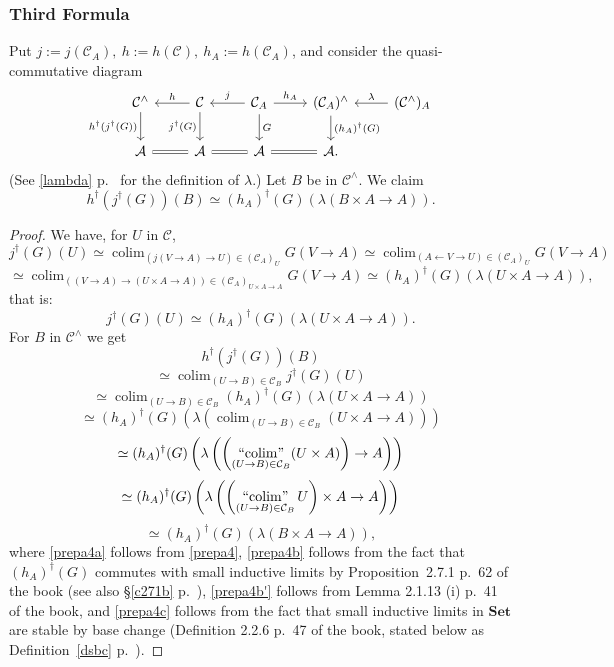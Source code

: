 \documentclass[12pt]{article}
\theoremstyle{remark}
\theoremstyle{definition}
\newcommand{\A}{\mathcal A}
\newcommand{\C}{\mathcal C}
\newcommand{\Set}{\mathbf{Set}}
\DeclareMathOperator*{\colim}{colim}
\DeclareMathOperator*{\icolim}{``\!\colim\!"}
\begin{document}
% 

\subsubsection{Third Formula}

Put $j:=j(\C_A),\ h:=h(\C),\ h_A:=h(\C_A)$, and consider the quasi-commutative diagram 
$$
\begin{tikzcd}
\C^\wedge\ar{d}[swap]{h^\dagger(j^\dagger(G))}&
\C\ar{l}[swap]{h}\ar{d}[swap]{j^\dagger(G)}&
\C_A\ar{l}[swap]{j}\ar{r}{h_A}\ar{d}{G}&
(\C_A)^\wedge\ar{d}{(h_A)^\dagger(G)}&
(\C^\wedge)_A\ar{l}[swap]{\lambda}\\ 
\A\ar[equal]{r}&\A\ar[equal]{r}&\A\ar[equal]{r}&\A.
\end{tikzcd}
$$ 
(See \eqref{lambda} p.~\pageref{lambda} for the definition of $\lambda$.) Let $B$ be in $\C^\wedge$. We claim 
\begin{equation}\label{prepa3}
h^\dagger(j^\dagger(G))(B)\simeq(h_A)^\dagger(G)(\lambda(B\times A\to A)).
\end{equation} 

\begin{proof}
We have, for $U$ in $\C$, 
$$
j^\dagger(G)(U)\simeq\colim_{(j(V\to A)\to U)\in(\C_A)_U}G(V\to A)\simeq\colim_{(A\leftarrow V\to U)\in(\C_A)_U}G(V\to A)
$$
$$
\simeq\colim_{((V\to A)\to(U\times A\to A))\in(\C_A)_{U\times A\to A}}G(V\to A)\simeq(h_A)^\dagger(G)(\lambda(U\times A\to A)),
$$
that is: 
%
\begin{equation}\label{prepa4}
j^\dagger(G)(U)\simeq(h_A)^\dagger(G)(\lambda(U\times A\to A)).
\end{equation} 
%
For $B$ in $\C^\wedge$ we get 
$$
h^\dagger(j^\dagger(G))(B)
$$
$$
\simeq\colim_{(U\to B)\in\C_B}j^\dagger(G)(U)
$$ 
%
\begin{equation}\label{prepa4a}
\simeq\colim_{(U\to B)\in\C_B}(h_A)^\dagger(G)(\lambda(U\times A\to A))
\end{equation} 
\begin{equation}\label{prepa4b}
\simeq(h_A)^\dagger(G)\left(\lambda\left(\colim_{(U\to B)\in\C_B}(U\times A\to A)\right)\right)
\end{equation} 
%
\begin{equation}\label{prepa4b'}
\simeq(h_A)^\dagger(G)\left(\lambda\left(\left(\icolim_{(U\to B)\in\C_B}(U\times A)\right)\to A\right)\right)
\end{equation}
\begin{equation}\label{prepa4c}
\simeq(h_A)^\dagger(G)\left(\lambda\left(\left(\icolim_{(U\to B)\in\C_B}U\right)\times A\to A\right)\right)
\end{equation} 
%
$$
\simeq(h_A)^\dagger(G)(\lambda(B\times A\to A)),
$$ 
where 
\eqref{prepa4a} follows from \eqref{prepa4}, 
\eqref{prepa4b} follows from the fact that $(h_A)^\dagger(G)$ commutes with small inductive limits by Proposition~2.7.1 p.~62 of the book (see also \S\ref{c271b} p.~\pageref{c271b}),  
\eqref{prepa4b'} follows from Lemma 2.1.13 (i) p.~41 of the book, and 
\eqref{prepa4c} follows from the fact that small inductive limits in $\Set$ are stable by base change (Definition 2.2.6 p.~47 of the book, stated below as Definition~\ref{dsbc} p.~\pageref{dsbc}). 
\end{proof}
\end{document}
